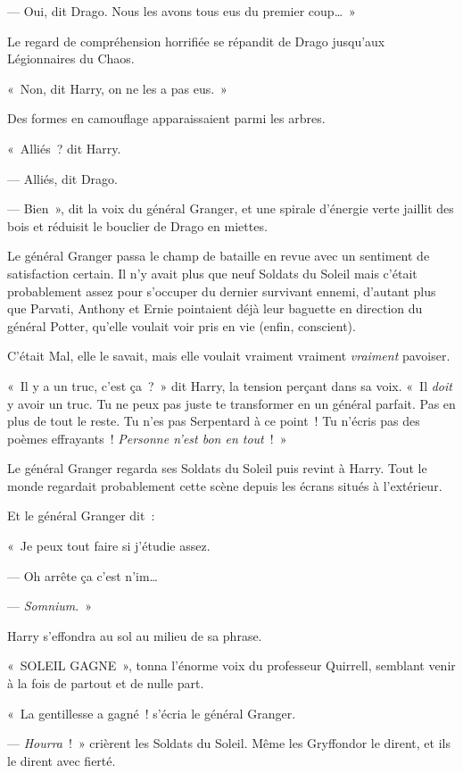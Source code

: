 {--- Oui, dit Drago.
Nous les avons tous eus du premier coup…~»

Le regard de compréhension horrifiée se répandit de Drago jusqu'aux Légionnaires du Chaos.

«~Non, dit Harry, on ne les a pas eus.~»

Des formes en camouflage apparaissaient parmi les arbres.

«~Alliés~? dit Harry.

--- Alliés, dit Drago.

--- Bien~», dit la voix du général Granger, et une spirale d'énergie verte jaillit des bois et réduisit le bouclier de Drago en miettes.

\later

Le général Granger passa le champ de bataille en revue avec un sentiment de satisfaction certain.
Il n'y avait plus que neuf Soldats du Soleil mais c'était probablement assez pour s'occuper du dernier survivant ennemi, d'autant plus que Parvati, Anthony et Ernie pointaient déjà leur baguette en direction du général Potter, qu'elle voulait voir pris en vie (enfin, conscient).

C'était Mal, elle le savait, mais elle voulait vraiment vraiment \emph{vraiment} pavoiser.

«~Il y a un truc, c'est ça~?~»
dit Harry, la tension perçant dans sa voix.
«~Il \emph{doit} y avoir un truc.
Tu ne peux pas juste te transformer en un général parfait.
Pas en plus de tout le reste.
Tu n'es pas Serpentard à ce point~!
Tu n'écris pas des poèmes effrayants~!
\emph{Personne n'est bon en tout}~!~»

Le général Granger regarda ses Soldats du Soleil puis revint à Harry.
Tout le monde regardait probablement cette scène depuis les écrans situés à l'extérieur.

Et le général Granger dit~:

«~Je peux tout faire si j'étudie assez.

--- Oh arrête ça c'est n'im…

--- \emph{Somnium}.~»

Harry s'effondra au sol au milieu de sa phrase.

«~SOLEIL GAGNE~», tonna l'énorme voix du professeur Quirrell, semblant venir à la fois de partout et de nulle part.

«~La gentillesse a gagné~! s'écria le général Granger.

--- \emph{Hourra}~!~»
crièrent les Soldats du Soleil.
Même les Gryffondor le dirent, et ils le dirent avec fierté.

}

